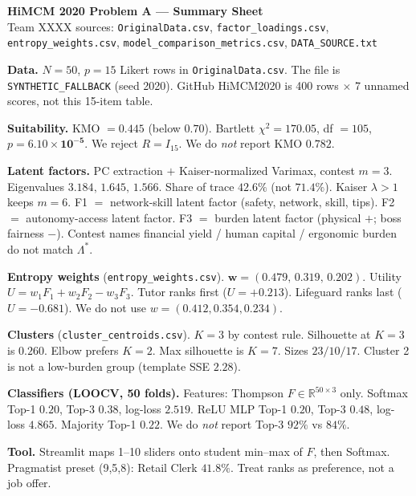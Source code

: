 \documentclass[11pt]{article}
\begin{document}
\begin{center}
{\Large\bfseries HiMCM 2020 Problem A --- Summary Sheet}\\[0.15em]
{\small Team XXXX \quad sources:
\texttt{OriginalData.csv},
\texttt{factor\_loadings.csv},
\texttt{entropy\_weights.csv},
\texttt{model\_comparison\_metrics.csv},
\texttt{DATA\_SOURCE.txt}}
\end{center}
\vspace{0.25em}

\noindent\textbf{Data.}
\(N=50\), \(p=15\) Likert rows in \texttt{OriginalData.csv}.
The file is \texttt{SYNTHETIC\_FALLBACK} (seed 2020).
GitHub HiMCM2020 is 400 rows \(\times\) 7 unnamed scores, not this 15-item table.

\medskip
\noindent\textbf{Suitability.}
KMO \(=\mathbf{0.445}\) (below \(0.70\)).
Bartlett \(\chi^2=\mathbf{170.05}\), df \(=105\), \(p=\mathbf{6.10\times 10^{-5}}\).
We reject \(R=I_{15}\).
We do \emph{not} report KMO \(0.782\).

\medskip
\noindent\textbf{Latent factors.}
PC extraction \(+\) Kaiser-normalized Varimax, contest \(m=3\).
Eigenvalues \(3.184,\,1.645,\,1.566\).
Share of trace \(\mathbf{42.6\%}\) (not \(71.4\%\)).
Kaiser \(\lambda>1\) keeps \(m=6\).
F1 \(=\) network-skill latent factor (safety, network, skill, tips).
F2 \(=\) autonomy-access latent factor.
F3 \(=\) burden latent factor (physical \(+\); boss fairness \(-\)).
Contest names financial yield / human capital / ergonomic burden do not match \(\Lambda^{\ast}\).

\medskip
\noindent\textbf{Entropy weights}
(\texttt{entropy\_weights.csv}).
\(\mathbf{w=(0.479,\,0.319,\,0.202)}\).
Utility \(U=w_1F_1+w_2F_2-w_3F_3\).
Tutor ranks first (\(U=+0.213\)).
Lifeguard ranks last (\(U=-0.681\)).
We do not use \(w=(0.412,0.354,0.234)\).

\medskip
\noindent\textbf{Clusters}
(\texttt{cluster\_centroids.csv}).
\(K=3\) by contest rule.
Silhouette at \(K=3\) is \(0.260\).
Elbow prefers \(K=2\).
Max silhouette is \(K=7\).
Sizes \(23/10/17\).
Cluster 2 is not a low-burden group (template SSE \(2.28\)).

\medskip
\noindent\textbf{Classifiers (LOOCV, 50 folds).}
Features: Thompson \(F\in\mathbb{R}^{50\times 3}\) only.
Softmax Top-1 \(\mathbf{0.20}\), Top-3 \(\mathbf{0.38}\), log-loss \(2.519\).
ReLU MLP Top-1 \(0.20\), Top-3 \(\mathbf{0.48}\), log-loss \(4.865\).
Majority Top-1 \(\mathbf{0.22}\).
We do \emph{not} report Top-3 \(92\%\) vs \(84\%\).

\medskip
\noindent\textbf{Tool.}
Streamlit maps 1--10 sliders onto student min--max of \(F\), then Softmax.
Pragmatist preset (9,5,8): Retail Clerk \(41.8\%\).
Treat ranks as preference, not a job offer.
\end{document}
